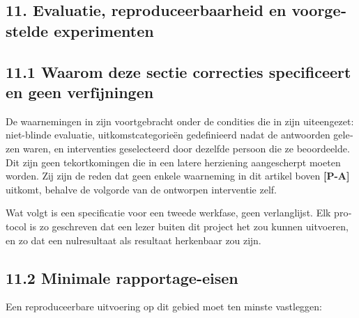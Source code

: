 \begin{dutch}
\section*{11. Evaluatie, reproduceerbaarheid en voorgestelde experimenten}
\label{sec:nl:11}


\subsection*{11.1 Waarom deze sectie correcties specificeert en geen verfijningen}
\label{sec:nl:11.1}

De waarnemingen in  zijn voortgebracht onder de condities die in  zijn uiteengezet: niet-blinde evaluatie, uitkomstcategorieën gedefinieerd nadat de antwoorden gelezen waren, en interventies geselecteerd door dezelfde persoon die ze beoordeelde. Dit zijn geen tekortkomingen die in een latere herziening aangescherpt moeten worden. Zij zijn de reden dat geen enkele waarneming in dit artikel boven \textbf{[P-A]} uitkomt, behalve de volgorde van de ontworpen interventie zelf.

Wat volgt is een specificatie voor een tweede werkfase, geen verlanglijst. Elk protocol is zo geschreven dat een lezer buiten dit project het zou kunnen uitvoeren, en zo dat een nulresultaat als resultaat herkenbaar zou zijn.


\subsection*{11.2 Minimale rapportage-eisen}
\label{sec:nl:11.2}

Een reproduceerbare uitvoering op dit gebied moet ten minste vastleggen:


\end{dutch}
